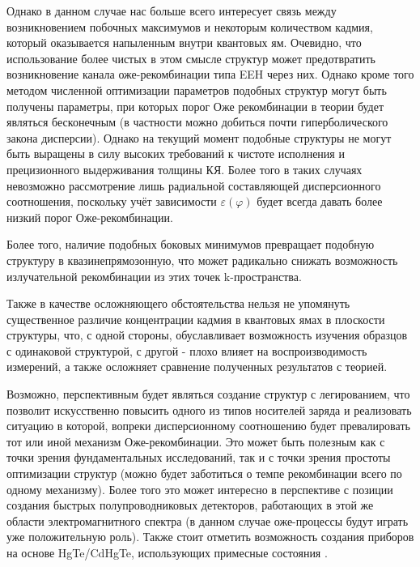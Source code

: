 \documentclass[../main.tex]{subfiles}
\begin{document}
    Однако в данном случае нас больше всего интересует связь между возникновением побочных максимумов и некоторым количеством 
    кадмия, который оказывается напыленным внутри квантовых ям. Очевидно, что использование более чистых в этом смысле структур
    может предотвратить возникновение канала оже-рекомбинации типа EEH через них. Однако кроме того методом численной оптимизации параметров 
    подобных структур могут быть получены параметры, при которых порог Оже рекомбинации в теории будет являться бесконечным (в частности можно добиться почти 
    гиперболического закона дисперсии). Однако на текущий момент подобные структуры не могут быть выращены в силу высоких требований к чистоте исполнения и 
    прецизионного выдерживания толщины КЯ. Более того в таких случаях невозможно рассмотрение лишь радиальной составляющей дисперсионного соотношения,
    поскольку учёт зависимости $\varepsilon(\varphi)$ будет всегда давать более низкий порог Оже-рекомбинации.

    Более того, наличие подобных боковых минимумов превращает подобную структуру в квазинепрямозонную, что может радикально снижать возможность излучательной 
    рекомбинации из этих точек k-пространства. 

    Также в качестве осложняющего обстоятельства нельзя не упомянуть существенное различие концентрации кадмия в квантовых ямах в плоскости структуры,
    что, с одной стороны, обуславливает возможность изучения образцов с одинаковой структурой, с другой - плохо влияет на воспроизводимость измерений,
    а также осложняет сравнение полученных результатов с теорией.

    Возможно, перспективным будет являться создание структур с легированием, что позволит искусственно повысить одного из типов носителей заряда и реализовать 
    ситуацию в которой, вопреки дисперсионному соотношению будет превалировать тот или иной механизм Оже-рекомбинации. Это может быть полезным как с точки зрения 
    фундаментальных исследований, так и с точки зрения простоты оптимизации структур (можно будет заботиться о темпе рекомбинации всего по одному механизму). 
    Более того это может интересно в перспективе с позиции создания быстрых полупроводниковых детекторов, работающих в этой же области электромагнитного спектра 
    (в данном случае оже-процессы будут играть уже положительную роль). Также стоит отметить возможность создания приборов на основе HgTe/CdHgTe, использующих
    примесные состояния \cite{Kozlov:2019}.
    
\end{document}
